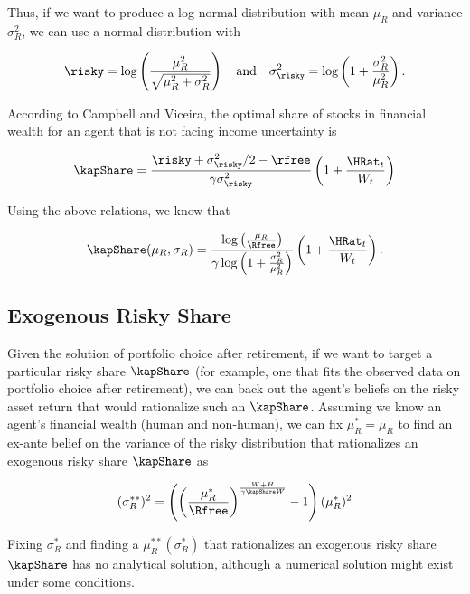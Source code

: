 \documentclass[PortfolioChoiceWithRiskyHousing]{subfiles}
\begin{document}
Thus, if we want to produce a log-normal distribution with mean $\mu_R$ and variance $\sigma_R^2$, we can use a normal distribution with

\begin{equation}
	\risky = \log \left( \frac{\mu_R^2}{\sqrt{\mu_R^2 + \sigma_R^2}} \right) \quad \text{and} \quad \sigma_\risky^2 = \log \left(1 + \frac{\sigma_R^2}{\mu_R^2} \right).
\end{equation}

According to Campbell and Viceira, the optimal share of stocks in financial wealth for an agent that is not facing income uncertainty is

\begin{equation}
	\kapShare = \frac{\risky + \sigma_\risky^2/2 - \rfree}{\gamma \sigma_\risky^2}\left( 1 + \frac{\HRat_{t}}{W_{t}} \right)
\end{equation}

Using the above relations, we know that

\begin{equation}
	\kapShare(\mu_R, \sigma_R) = \frac{\log \left(\frac{\mu_R}{\Rfree}\right)}{\gamma \log \left(1 + \frac{\sigma_R^2}{\mu_R^2} \right)} \left( 1 + \frac{\HRat_{t}}{W_{t}} \right).
\end{equation}

\subsection{Exogenous Risky Share}

Given the solution of portfolio choice after retirement, if we want to target a particular risky share $\kapShare$ (for example, one that fits the observed data on portfolio choice after retirement), we can back out the agent's beliefs on the risky asset return that would rationalize such an $\kapShare$. Assuming we know an agent's financial wealth (human and non-human), we can fix $\mu_R^* = \mu_R$ to find an ex-ante belief on the variance of the risky distribution that rationalizes an exogenous risky share $\kapShare$ as

\begin{equation}
	(\sigma_R^{**})^2 = \left( \left(\frac{\mu_R^*}{\Rfree}\right)^{\frac{W + H}{\gamma \kapShare W}} -1 \right) (\mu_R^{*})^2
\end{equation}

Fixing $\sigma_R^*$ and finding a $\mu_R^{**}(\sigma_R^*)$ that rationalizes an exogenous risky share $\kapShare$ has no analytical solution, although a numerical solution might exist under some conditions.
\end{document}
